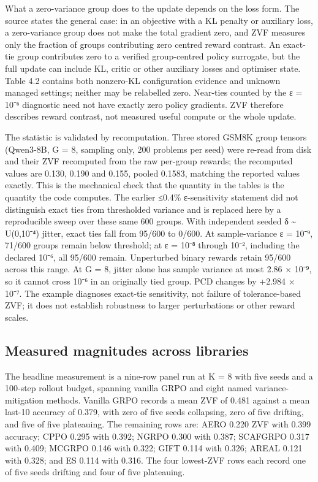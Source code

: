 \documentclass[12pt,a4paper]{report}
\begin{document}
What a zero-variance group does to the update depends on the loss form.
The source states the general case: in an objective with a KL penalty or
auxiliary loss, a zero-variance group does not make the total gradient
zero, and ZVF measures only the fraction of groups contributing zero
centred reward contrast. An exact-tie group contributes zero to a
verified group-centred policy surrogate, but the full update can include
KL, critic or other auxiliary losses and optimiser state. Table 4.2
contains both nonzero-KL configuration evidence and unknown managed
settings; neither may be relabelled zero. Near-ties counted by the ε =
10⁻⁶ diagnostic need not have exactly zero policy gradients. ZVF
therefore describes reward contrast, not measured useful compute or the
whole update.

The statistic is validated by recomputation. Three stored GSM8K group
tensors (Qwen3-8B, G = 8, sampling only, 200 problems per seed) were
re-read from disk and their ZVF recomputed from the raw per-group
rewards; the recomputed values are 0.130, 0.190 and 0.155, pooled
0.1583, matching the reported values exactly. This is the mechanical
check that the quantity in the tables is the quantity the code computes.
The earlier ≤0.4\% ε-sensitivity statement did not distinguish exact
ties from thresholded variance and is replaced here by a reproducible
sweep over these same 600 groups. With independent seeded δ
\textasciitilde{} U(0,10⁻⁴) jitter, exact ties fall from 95/600 to
0/600. At sample-variance ε = 10⁻⁹, 71/600 groups remain below
threshold; at ε = 10⁻⁸ through 10⁻², including the declared 10⁻⁶, all
95/600 remain. Unperturbed binary rewards retain 95/600 across this
range. At G = 8, jitter alone has sample variance at most 2.86 × 10⁻⁹,
so it cannot cross 10⁻⁶ in an originally tied group. PCD changes by
+2.984 × 10⁻⁷. The example diagnoses exact-tie sensitivity, not failure
of tolerance-based ZVF; it does not establish robustness to larger
perturbations or other reward scales.

\subsection{Measured magnitudes across
libraries}\label{measured-magnitudes-across-libraries}

The headline measurement is a nine-row panel run at K = 8 with five
seeds and a 100-step rollout budget, spanning vanilla GRPO and eight
named variance-mitigation methods. Vanilla GRPO records a mean ZVF of
0.481 against a mean last-10 accuracy of 0.379, with zero of five seeds
collapsing, zero of five drifting, and five of five plateauing. The
remaining rows are: AERO 0.220 ZVF with 0.399 accuracy; CPPO 0.295 with
0.392; NGRPO 0.300 with 0.387; SCAFGRPO 0.317 with 0.409; MCGRPO 0.146
with 0.322; GIFT 0.114 with 0.326; AREAL 0.121 with 0.328; and ES 0.114
with 0.316. The four lowest-ZVF rows each record one of five seeds
drifting and four of five plateauing.
\end{document}

